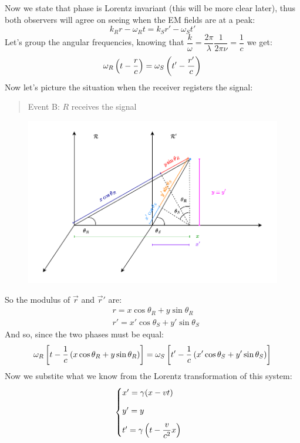 Now we state that phase is Lorentz invariant (this will be more clear later), thus both observers will agree on seeing when the EM fields are at a peak:
\begin{equation}
  k_{R}r-\omega_{R} t = k_{S}r' - \omega_{S} t'
\end{equation}
Let's group the angular frequencies, knowing that $\dfrac{k}{\omega} = \dfrac{2\pi}{\lambda}\dfrac{1}{2\pi\nu} = \dfrac{1}{c}$ we get:
\begin{equation}
  \omega_{R}\left(t-\dfrac{r}{c}\right) = \omega_{S}\left(t'-\dfrac{r'}{c}\right)
\end{equation}
Now let's picture the situation when the receiver registers the signal:
\begin{quotation}
  Event B: $R$ receives the signal
\end{quotation}
\begin{figure}[H]
  \centering
  \includegraphics[width=0.8\linewidth]{res/svg/Doppler_geometry.drawio}
\end{figure}
So the modulus of $\vec{r}$ and $\vec{r}'$ are:
\begin{equation}
  \begin{split}
    &r = x\cos\theta_R + y\sin\theta_R \\[8pt]
    &r' = x'\cos\theta_S + y'\sin\theta_S
  \end{split}
\end{equation}
And so, since the two phases must be equal:
\begin{equation}
  \omega_{R}\left[t-\dfrac{1}{c}\left(x\cos\theta_R + y\sin\theta_R\right)\right] = \omega_{S}\left[t'-\dfrac{1}{c}\left(x'\cos\theta_S + y'\sin\theta_S\right)\right]
\end{equation}
Now we substite what we know from the Lorentz transformation of this system:
\begin{equation}
  \begin{cases}
    x' = \gamma(x - vt) \\[8pt]
    y' = y \\[8pt]
    t' = \gamma\left(t - \dfrac{v}{c^2}x\right)
  \end{cases}
\end{equation}
